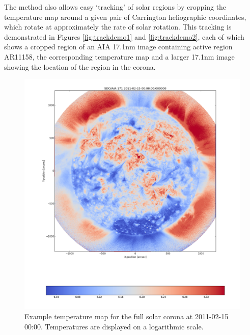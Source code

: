 \documentclass[referee,a4paper,12pt]{swsc}
\begin{document}
\begin{linenumbers}
The  method also allows easy `tracking' of solar regions by cropping the temperature map around a given pair of Carrington heliographic coordinates, which rotate at approximately the rate of solar rotation.
This tracking is demonstrated in Figures \ref{fig:trackdemo1} and \ref{fig:trackdemo2}, each of which shows a cropped region of an AIA 17.1nm image containing active region AR11158, the corresponding temperature map and a larger 17.1nm image showing the location of the region in the corona.

\begin{figure}
	\centering
		\includegraphics[width=\columnwidth]{2011-02-15T00_00_00.png}
	\caption{Example temperature map for the full solar corona at 2011-02-15 00:00. Temperatures are displayed on a logarithmic scale.}
	\label{fig:example_tmap}
\end{figure}


\end{linenumbers}
\end{document}
